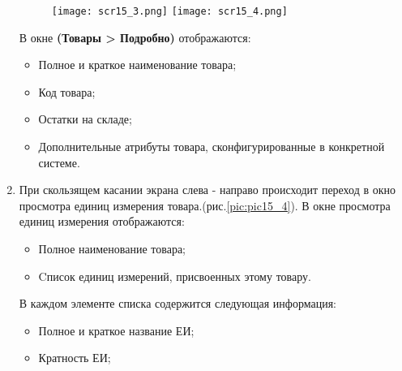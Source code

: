 \begin{enumerate}[\thesection .1]
\begin{figure}[!h]
\begin{floatrow}
		{\texttt{[image: scr15\_3.png]}}
		{\texttt{[image: scr15\_4.png]}}         
	\end{floatrow}
\end{figure}
В окне \textbf{(Товары > Подробно)} отображаются: 
\begin{itemize}
	\item Полное и краткое наименование товара;
	\item Код товара;
	\item Остатки на складе;
	\item Дополнительные атрибуты товара, сконфигурированные в конкретной системе.
\end{itemize}
\item При скользящем касании экрана слева - направо происходит переход в окно просмотра единиц измерения товара.(рис.\ref {pic:pic15_4}). 
В окне просмотра единиц измерения отображаются: 
\begin{itemize}
	\item Полное наименование товара;
	\item Cписок единиц измерений, присвоенных этому товару.
\end{itemize}
В каждом элементе списка содержится следующая информация:
\begin{itemize}
	\item Полное и краткое название ЕИ;
	\item Кратность ЕИ;
\end{itemize}
\end{enumerate}
